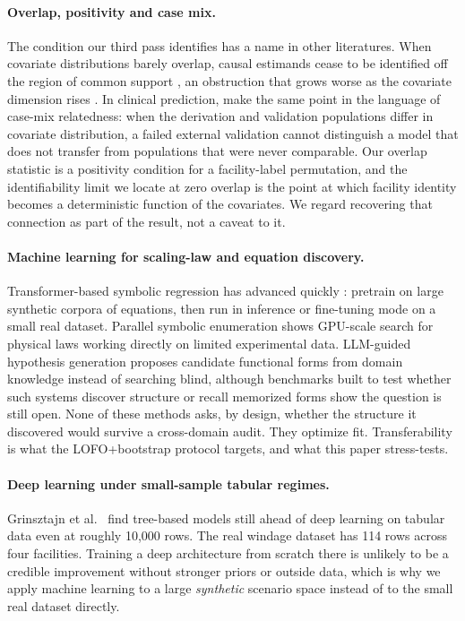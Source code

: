 \documentclass[journal=dce]{CUP-JNL-DTM}%
\begin{document}
\paragraph{Overlap, positivity and case mix.}
The condition our third pass identifies has a name in other literatures. When covariate distributions barely overlap, causal estimands cease to be identified off the region of common support \citep{crump2009dealing}, an obstruction that grows worse as the covariate dimension rises \citep{damour2021overlap}. In clinical prediction, \citet{debray2015new} make the same point in the language of case-mix relatedness: when the derivation and validation populations differ in covariate distribution, a failed external validation cannot distinguish a model that does not transfer from populations that were never comparable. Our overlap statistic is a positivity condition for a facility-label permutation, and the identifiability limit we locate at zero overlap is the point at which facility identity becomes a deterministic function of the covariates. We regard recovering that connection as part of the result, not a caveat to it.

\paragraph{Machine learning for scaling-law and equation discovery.}
Transformer-based symbolic regression has advanced quickly \citep{biggio2021nesymres,kamienny2022,tpsr2023}: pretrain on large synthetic corpora of equations, then run in inference or fine-tuning mode on a small real dataset. Parallel symbolic enumeration \citep{pse2026} shows GPU-scale search for physical laws working directly on limited experimental data. LLM-guided hypothesis generation \citep{hu2024physagent} proposes candidate functional forms from domain knowledge instead of searching blind, although benchmarks built to test whether such systems discover structure or recall memorized forms \citep{shojaee2025llmsrbench} show the question is still open. None of these methods asks, by design, whether the structure it discovered would survive a cross-domain audit. They optimize fit. Transferability is what the LOFO+bootstrap protocol targets, and what this paper stress-tests.

\paragraph{Deep learning under small-sample tabular regimes.}
Grinsztajn et al.\ \citep{grinsztajn2022} find tree-based models still ahead of deep learning on tabular data even at roughly 10,000 rows. The real windage dataset has 114 rows across four facilities. Training a deep architecture from scratch there is unlikely to be a credible improvement without stronger priors or outside data, which is why we apply machine learning to a large \emph{synthetic} scenario space instead of to the small real dataset directly.
\end{document}
